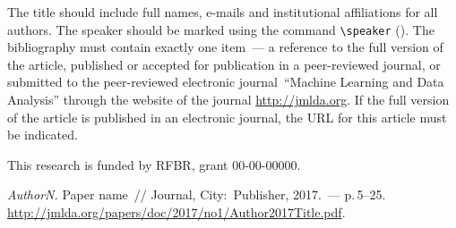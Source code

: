 \documentclass[twoside]{article}
\begin{document}
The title should include full names, e-mails and institutional affiliations for all authors. The speaker should be marked using the command \verb|\speaker| (\speaker).
The bibliography must contain exactly one item~--- a reference to the full version of the article,
published or accepted for publication in a peer-reviewed journal,
or submitted to the peer-reviewed electronic journal~``Machine Learning and Data Analysis''
through the website of the journal \url{http://jmlda.org}.
If the full version of the article is published in an electronic journal, the URL for this article must be indicated.

This research is funded by RFBR, grant 00-00-00000.

\begin{thebibliography}{1}
    \emph{Author\;N.}
    Paper name~//
    Journal,
    City:~Publisher, 2017.~--- p.\,5--25.
    \url{http://jmlda.org/papers/doc/2017/no1/Author2017Title.pdf}.
\end{thebibliography}
\end{document}
